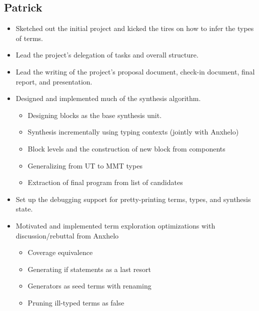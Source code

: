 \documentclass[review, sigplan]{acmart}
\begin{document}
\subsection{Patrick}
\begin{itemize}
  \item Sketched out the initial project and kicked the tires on how to infer
        the types of terms.
  \item Lead the project's delegation of tasks and overall structure.
  \item Lead the writing of the project's proposal document, check-in document,
        final report, and presentation.
  \item Designed and implemented much of the synthesis algorithm.
        \begin{itemize}
          \item Designing blocks as the base synthesis unit.
          \item Synthesis incrementally using typing contexts (jointly with Anxhelo)
          \item Block levels and the construction of new block from components
          \item Generalizing from UT to MMT types
          \item Extraction of final program from list of candidates
        \end{itemize}
  \item Set up the debugging support for pretty-printing terms, types, and
        synthesis state.
  \item Motivated and implemented term exploration optimizations with
        discussion/rebuttal from Anxhelo
        \begin{itemize}
          \item Coverage equivalence
          \item Generating if statements as a last resort
          \item Generators as seed terms with renaming
          \item Pruning ill-typed terms as false
        \end{itemize}
\end{itemize}
\end{document}
